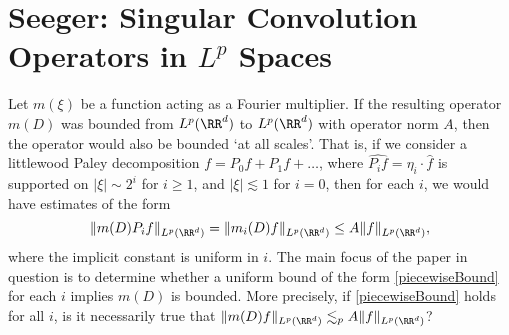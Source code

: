 \begin{itemize}


\end{itemize}


\chapter{Seeger: Singular Convolution Operators in $L^p$ Spaces}

Let $m(\xi)$ be a function acting as a Fourier multiplier. If the resulting operator $m(D)$ was bounded from $L^p(\RR^d)$ to $L^p(\RR^d)$ with operator norm $A$, then the operator would also be bounded `at all scales'. That is, if we consider a littlewood Paley decomposition $f = P_0 f + P_1 f + \dots$, where $\widehat{P_i f} = \eta_i \cdot \widehat{f}$ is supported on $|\xi| \sim 2^i$ for $i \geq 1$, and $|\xi| \lesssim 1$ for $i = 0$, then for each $i$, we would have estimates of the form
%
\begin{equation} \label{piecewiseBound}
    \| m(D) P_i f \|_{L^p(\RR^d)} = \| m_i(D) f \|_{L^p(\RR^d)} \leq A \| f \|_{L^p(\RR^d)},
\end{equation}
%
where the implicit constant is uniform in $i$. The main focus of the paper in question is to determine whether a uniform bound of the form \eqref{piecewiseBound} for each $i$ implies $m(D)$ is bounded. More precisely, if \eqref{piecewiseBound} holds for all $i$, is it necessarily true that $\| m(D) f \|_{L^p(\RR^d)} \lesssim_p A \| f \|_{L^p(\RR^d)}$?


